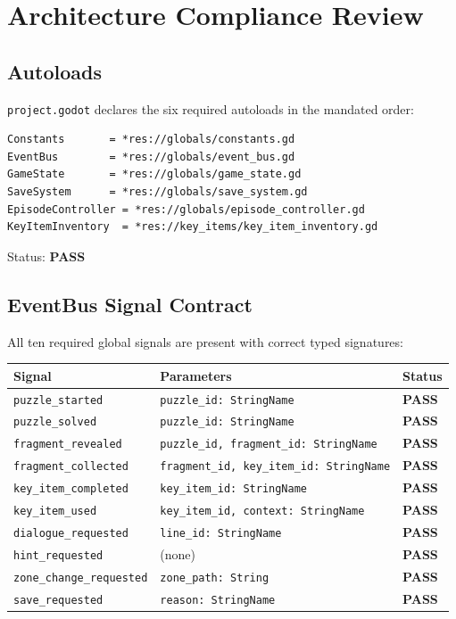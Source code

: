\documentclass[12pt, a4paper]{article}
\newcommand{\statuspass}{\textcolor{passgre}{\textbf{PASS}}}
\begin{document}
\section{Architecture Compliance Review}

\subsection{Autoloads}

\texttt{project.godot} declares the six required autoloads in the mandated order:

\begin{lstlisting}
Constants       = *res://globals/constants.gd
EventBus        = *res://globals/event_bus.gd
GameState       = *res://globals/game_state.gd
SaveSystem      = *res://globals/save_system.gd
EpisodeController = *res://globals/episode_controller.gd
KeyItemInventory  = *res://key_items/key_item_inventory.gd
\end{lstlisting}

Status: \statuspass

\subsection{EventBus Signal Contract}

All ten required global signals are present with correct typed signatures:

\begin{center}
\begin{tabular}{lll}
\toprule
\textbf{Signal} & \textbf{Parameters} & \textbf{Status} \\
\midrule
\texttt{puzzle\_started}     & \texttt{puzzle\_id: StringName}       & \statuspass \\
\texttt{puzzle\_solved}      & \texttt{puzzle\_id: StringName}       & \statuspass \\
\texttt{fragment\_revealed}  & \texttt{puzzle\_id, fragment\_id: StringName} & \statuspass \\
\texttt{fragment\_collected} & \texttt{fragment\_id, key\_item\_id: StringName} & \statuspass \\
\texttt{key\_item\_completed}& \texttt{key\_item\_id: StringName}    & \statuspass \\
\texttt{key\_item\_used}     & \texttt{key\_item\_id, context: StringName} & \statuspass \\
\texttt{dialogue\_requested} & \texttt{line\_id: StringName}         & \statuspass \\
\texttt{hint\_requested}     & (none)                                & \statuspass \\
\texttt{zone\_change\_requested} & \texttt{zone\_path: String}       & \statuspass \\
\texttt{save\_requested}     & \texttt{reason: StringName}           & \statuspass \\
\bottomrule
\end{tabular}
\end{center}
\end{document}
